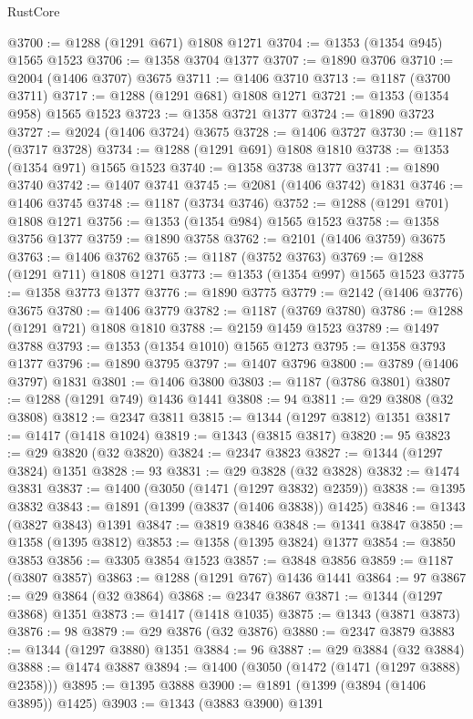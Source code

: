 \begin{lexlean}{RustCore}
\begin{coremodule}
{\begin{coremodule}
{{{{{{{{{{{{{{{{{{{{{{{{{{{{{{{{{{{{{{{{{{{{@3700 := @1288 (@1291 @671) @1808 @1271
@3704 := @1353 (@1354 @945) @1565 @1523
@3706 := @1358 @3704 @1377
@3707 := @1890 @3706
@3710 := @2004 (@1406 @3707) @3675
@3711 := @1406 @3710
@3713 := @1187 (@3700 @3711)
@3717 := @1288 (@1291 @681) @1808 @1271
@3721 := @1353 (@1354 @958) @1565 @1523
@3723 := @1358 @3721 @1377
@3724 := @1890 @3723
@3727 := @2024 (@1406 @3724) @3675
@3728 := @1406 @3727
@3730 := @1187 (@3717 @3728)
@3734 := @1288 (@1291 @691) @1808 @1810
@3738 := @1353 (@1354 @971) @1565 @1523
@3740 := @1358 @3738 @1377
@3741 := @1890 @3740
@3742 := @1407 @3741
@3745 := @2081 (@1406 @3742) @1831
@3746 := @1406 @3745
@3748 := @1187 (@3734 @3746)
@3752 := @1288 (@1291 @701) @1808 @1271
@3756 := @1353 (@1354 @984) @1565 @1523
@3758 := @1358 @3756 @1377
@3759 := @1890 @3758
@3762 := @2101 (@1406 @3759) @3675
@3763 := @1406 @3762
@3765 := @1187 (@3752 @3763)
@3769 := @1288 (@1291 @711) @1808 @1271
@3773 := @1353 (@1354 @997) @1565 @1523
@3775 := @1358 @3773 @1377
@3776 := @1890 @3775
@3779 := @2142 (@1406 @3776) @3675
@3780 := @1406 @3779
@3782 := @1187 (@3769 @3780)
@3786 := @1288 (@1291 @721) @1808 @1810
@3788 := @2159 @1459 @1523
@3789 := @1497 @3788
@3793 := @1353 (@1354 @1010) @1565 @1273
@3795 := @1358 @3793 @1377
@3796 := @1890 @3795
@3797 := @1407 @3796
@3800 := @3789 (@1406 @3797) @1831
@3801 := @1406 @3800
@3803 := @1187 (@3786 @3801)
@3807 := @1288 (@1291 @749) @1436 @1441
@3808 := 94
@3811 := @29 @3808 (@32 @3808)
@3812 := @2347 @3811
@3815 := @1344 (@1297 @3812) @1351
@3817 := @1417 (@1418 @1024)
@3819 := @1343 (@3815 @3817)
@3820 := 95
@3823 := @29 @3820 (@32 @3820)
@3824 := @2347 @3823
@3827 := @1344 (@1297 @3824) @1351
@3828 := 93
@3831 := @29 @3828 (@32 @3828)
@3832 := @1474 @3831
@3837 := @1400 (@3050 (@1471 (@1297 @3832) @2359))
@3838 := @1395 @3832
@3843 := @1891 (@1399 (@3837 (@1406 @3838)) @1425)
@3846 := @1343 (@3827 @3843) @1391
@3847 := @3819 @3846
@3848 := @1341 @3847
@3850 := @1358 (@1395 @3812)
@3853 := @1358 (@1395 @3824) @1377
@3854 := @3850 @3853
@3856 := @3305 @3854 @1523
@3857 := @3848 @3856
@3859 := @1187 (@3807 @3857)
@3863 := @1288 (@1291 @767) @1436 @1441
@3864 := 97
@3867 := @29 @3864 (@32 @3864)
@3868 := @2347 @3867
@3871 := @1344 (@1297 @3868) @1351
@3873 := @1417 (@1418 @1035)
@3875 := @1343 (@3871 @3873)
@3876 := 98
@3879 := @29 @3876 (@32 @3876)
@3880 := @2347 @3879
@3883 := @1344 (@1297 @3880) @1351
@3884 := 96
@3887 := @29 @3884 (@32 @3884)
@3888 := @1474 @3887
@3894 := @1400 (@3050 (@1472 (@1471 (@1297 @3888) @2358)))
@3895 := @1395 @3888
@3900 := @1891 (@1399 (@3894 (@1406 @3895)) @1425)
@3903 := @1343 (@3883 @3900) @1391
}}}}}}}}}}}}}}}}}}}}}}}}}}}}}}}}}}}}}}}}}}}}
\end{coremodule}}
\end{coremodule}
\end{lexlean}
